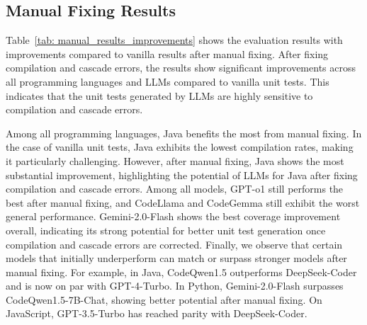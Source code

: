 \subsection{Manual Fixing Results}
\label{sec: manual fixing}


Table~\ref{tab: manual_results_improvements} shows the evaluation results with improvements compared to vanilla results after manual fixing. After fixing compilation and cascade errors, the results show significant improvements across all programming languages and LLMs compared to vanilla unit tests. This indicates that the unit tests generated by LLMs are highly sensitive to compilation and cascade errors.

Among all programming languages, Java benefits the most from manual fixing. In the case of vanilla unit tests, Java exhibits the lowest compilation rates, making it particularly challenging. However, after manual fixing, Java shows the most substantial improvement, highlighting the potential of LLMs for Java after fixing compilation and cascade errors. 
Among all models, GPT-o1 still performs the best after manual fixing, and CodeLlama and CodeGemma still exhibit the worst general performance.
Gemini-2.0-Flash shows the best coverage improvement overall, indicating its strong potential for better unit test generation once compilation and cascade errors are corrected.
Finally, we observe that certain models that initially underperform can match or surpass stronger models after manual fixing. For example, in Java, CodeQwen1.5 outperforms DeepSeek-Coder and is now on par with GPT-4-Turbo.
In Python, Gemini-2.0-Flash surpasses CodeQwen1.5-7B-Chat, showing better potential after manual fixing. On JavaScript, GPT-3.5-Turbo has reached parity with DeepSeek-Coder.



